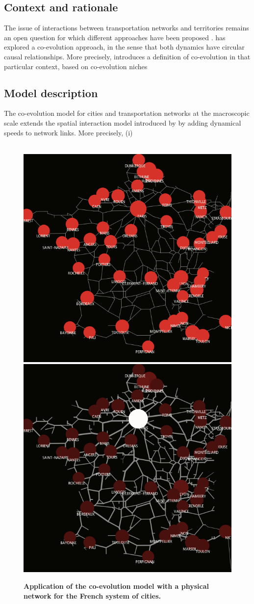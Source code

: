 \documentclass[english,fleqn,allpages]{ISTE_science}[2018/07/30]
\begin{document}
\subsection{Context and rationale}

The issue of interactions between transportation networks and territories remains an open question for which different approaches have been proposed \cite{offner1993effets,espacegeo2014effets}. \cite{raimbault2018caracterisation} has explored a co-evolution approach, in the sense that both dynamics have circular causal relationships. More precisely, \cite{raimbault2019modeling} introduces a definition of co-evolution in that particular context, based on co-evolution niches \cite{holland2012signals}

\cite{raimbault2018modeling}

\subsection{Model description}

The co-evolution model for cities and transportation networks at the macroscopic scale extends the spatial interaction model introduced by \cite{raimbault2018indirect} by adding dynamical speeds to network links. More precisely, (i)  



\begin{figure}
	\centering
	
	\\
	\includegraphics[width=0.48\linewidth]{figures/ex_real_1975.png}
	\includegraphics[width=0.48\linewidth]{figures/ex_real_1975_tf_adjusted.png}
	\caption{\textbf{Application of the co-evolution model with a physical network for the French system of cities.} }
\end{figure}
\end{document}
